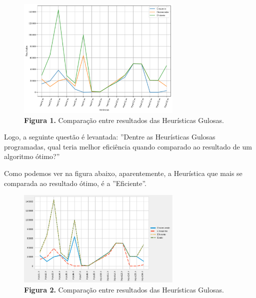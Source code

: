 \documentclass[a4paper, 12pt]{article}
\begin{document}
\begin{figure}[h]
    \centering
    \includegraphics[width=0.7\textwidth]{../imgs/greedy_compare.pdf}
    \caption{\textbf{Figura 1.} Comparação entre resultados das Heurísticas Gulosas.}
    \label{greedy_compare}
\end{figure}

Logo, a seguinte questão é levantada: ''Dentre as Heurísticas Gulosas programadas, qual teria melhor eficiência quando comparado ao resultado de um algoritmo ótimo?''

Como podemos ver na figura abaixo, aparentemente, a Heurística que mais se comparada ao resultado ótimo, é a ''Eficiente''.
\begin{figure}[h]
    \centering
    \includegraphics[width=0.7\textwidth]{../imgs/exact_compare.pdf}
    \caption{\textbf{Figura 2.} Comparação entre resultados das Heurísticas Gulosas.}
    \label{exact_compare}
\end{figure}
\end{document}
